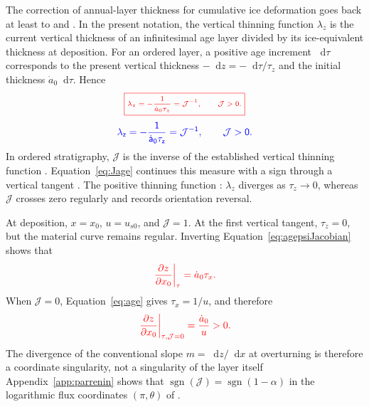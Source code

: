 \documentclass[review]{igs}
\providecommand{\DIFadd}[1]{{\protect\color{blue} \sf #1}} %
\providecommand{\DIFdel}[1]{{\protect\color{red} \scriptsize #1}} %
\providecommand{\DIFaddbegin}{} %
\providecommand{\DIFaddend}{} %
\providecommand{\DIFdelbegin}{} %
\providecommand{\DIFdelend}{} %
\newcommand{\DIFscaledelfig}{0.5}
\newlength{\DIFdelgraphicswidth} %
\newlength{\DIFdelgraphicsheight} %
\newcommand{\DIFaddincludegraphics}[2][]{{\color{blue}\fbox{\DIFOincludegraphics[#1]{#2}}}} %
\newcommand{\DIFdelincludegraphics}[2][]{%
\sbox{\DIFdelgraphicsbox}{\DIFOincludegraphics[#1]{#2}}%
\settoboxwidth{\DIFdelgraphicswidth}{\DIFdelgraphicsbox} %
\settoboxtotalheight{\DIFdelgraphicsheight}{\DIFdelgraphicsbox} %
\scalebox{\DIFscaledelfig}{%
\parbox[b]{\DIFdelgraphicswidth}{\usebox{\DIFdelgraphicsbox}\\[-\baselineskip] \rule{\DIFdelgraphicswidth}{0em}}\llap{\resizebox{\DIFdelgraphicswidth}{\DIFdelgraphicsheight}{%
\setlength{\unitlength}{\DIFdelgraphicswidth}%
\begin{picture}(1,1)%
\thicklines\linethickness{2pt} %
{\color[rgb]{1,0,0}\put(0,0){\framebox(1,1){}}}%
{\color[rgb]{1,0,0}\put(0,0){\line( 1,1){1}}}%
{\color[rgb]{1,0,0}\put(0,1){\line(1,-1){1}}}%
\end{picture}%
}\hspace*{3pt}}} %
} %
\DeclareRobustCommand{\DIFaddbegin}{\DIFOaddbegin \let\includegraphics\DIFaddincludegraphics} %
\DeclareRobustCommand{\DIFaddend}{\DIFOaddend \let\includegraphics\DIFOincludegraphics} %
\DeclareRobustCommand{\DIFdelbegin}{\DIFOdelbegin \let\includegraphics\DIFdelincludegraphics} %
\DeclareRobustCommand{\DIFdelend}{\DIFOaddend \let\includegraphics\DIFOincludegraphics} %
\begin{document}
\DIFaddend The correction of annual-layer thickness for cumulative ice deformation goes back at least to \citet{Nye1963} and \citet{DansgaardJohnsen1969}. In the present notation, the vertical thinning function \(\lambda_z\) is the current vertical thickness of an infinitesimal age layer divided by its ice-equivalent thickness at deposition. For an ordered layer, a positive age increment \(\mathop{}\!\mathrm{d}\tau\) corresponds to the present vertical thickness \(-\mathop{}\!\mathrm{d} z=-\mathop{}\!\mathrm{d}\tau/\tau_z\) and the initial thickness \(\dot a_0\mathop{}\!\mathrm{d}\tau\). Hence
\DIFdelbegin \begin{displaymath}
\DIFdel{\boxed{
\lambda_z
=-\frac{1}{\dot a_0\tau_z}
=\mathcal{J}^{-1},
\qquad \mathcal{J}>0.
}
}\end{displaymath}%
\DIFdelend \DIFaddbegin \begin{equation}
\DIFadd{\lambda_z
=-\frac{1}{\dot a_0\tau_z}
=\mathcal{J}^{-1},
\qquad \mathcal{J}>0.
\label{eq:thinningrelation}
}\end{equation}\DIFaddend 
In ordered stratigraphy, \(\mathcal{J}\) is the inverse of the established vertical thinning function \citep{Parrenin2013,ParreninChungMartin2025}. Equation~\ref{eq:Jage} continues this measure with a sign through a vertical tangent\DIFdelbegin \DIFdel{. The positive thinning function }\DIFdelend \DIFaddbegin \DIFadd{: \(\lambda_z\) }\DIFaddend diverges as \(\tau_z\rightarrow0\), whereas \(\mathcal{J}\) crosses zero regularly and records orientation reversal. \DIFdelbegin %

\DIFdel{At deposition, \(x=x_0\), \(u=u_{s0}\), and \(\mathcal{J}=1\). At the first vertical tangent, \(\tau_z=0\), but the material curve remains regular. Inverting Equation~\ref{eq:agepsiJacobian} shows that }\begin{displaymath}
\DIFdel{\left.\frac{\partial z}{\partial x_0}\right|_{\tau}
=\dot a_0\tau_x.
}\end{displaymath}%
\DIFdel{When \(\mathcal{J}=0\), Equation~\ref{eq:age} gives \(\tau_x=1/u\), and therefore
}\begin{displaymath}
\DIFdel{\left.\frac{\partial z}{\partial x_0}\right|_{\tau,\mathcal{J}=0}
=\frac{\dot a_0}{u}>0.
}\end{displaymath}%
\DIFdel{The divergence of the conventional slope \(m=\mathop{}\!\mathrm{d} z/\mathop{}\!\mathrm{d} x\) at overturning is therefore a coordinate singularity, not a singularity of the layer itself}\DIFdelend \DIFaddbegin \DIFadd{Appendix~\ref{app:parrenin} shows that \(\operatorname{sgn}(\mathcal{J})=\operatorname{sgn}(1-\alpha)\) in the logarithmic flux coordinates \((\pi,\theta)\) of \citet{ParreninHindmarsh2007}}\DIFaddend .
\end{document}
